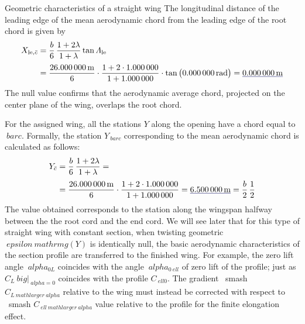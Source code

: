 \documentclass[[12pt,twoside]{book}
\begin{document}
\begin{myExampleX}{Geometric characteristics of a straight wing}{}
The longitudinal distance of the leading edge of the mean aerodynamic chord from the
leading edge of the root chord is given by
\[
\begin{split}
X_{\mathrm{le},\bar{c}} 
  & {}=
    \frac{b}{6} \, \frac{1+2\lambda}{1+\lambda} \tan\Lambda_\mathrm{le} \\[3pt]
  & {}=
    \frac{\SI[round-precision=1]{\mySpanWingMT}{\metre}}{6}
      \cdot 
      \frac{
        1 + 2\cdot\SI[round-precision=2]{\myTaperRatioWing}{}
      }{
        1 + \SI[round-precision=2]{\myTaperRatioWing}{}
      }
      \cdot \tan \big( \SI[round-precision=3]{\myLambdaLERad}{\radian} \big)
    = \mathunderline{mydarkblue}{ \SI[round-precision=2]{\myXLEMACWingMT}{\metre} }%
\end{split}
\]
The null value confirms that the aerodynamic average chord, projected on the center plane
of the wing, overlaps the root chord.

For the assigned wing, all the stations $ Y $ along the opening have a chord equal to $ \ bar {c} $.
Formally, the station $ Y _ {\ bar {c}} $ corresponding to the mean aerodynamic chord
is calculated as follows:
\[
\begin{split}
Y_{\bar{c}} 
  & {}=
    \frac{b}{6} \, \frac{1+2\lambda}{1+\lambda} = \\[3pt]
  & {}=
    \frac{\SI[round-precision=1]{\mySpanWingMT}{\metre}}{6}
      \cdot 
      \frac{
        1 + 2\cdot\SI[round-precision=2]{\myTaperRatioWing}{}
      }{
        1 + \SI[round-precision=2]{\myTaperRatioWing}{}
      }
    = \mathunderline{mydarkblue}{ \SI[round-precision=2]{\myYMACWingMT}{\metre} }
    = \frac{b}{2} \, \frac{1}{2}
\end{split}
\]
The value obtained corresponds to the station along the wingspan halfway between the
the root cord and the end cord.
We will see later that for this type of straight wing with constant section, when twisting
geometric $ \ epsilon_ \ mathrm {g} (Y) $ is identically null,
the basic aerodynamic characteristics of the section profile are transferred to the finished wing.
For example, the zero lift angle $ \ alpha_ {0L} $ coincides with the angle $ \ alpha_ {0 \ ell} $
of zero lift of the profile; just as $ C_L \ big | _ {\ alpha = 0} $ coincides with the profile $ C _ {\ ell 0} $.
The gradient \ smash {$ C_ {L_ \ mathlarger {\ alpha}} $} relative to the wing must instead be corrected with respect to
\ smash {$ C _ {\ ell_ \ mathlarger {\ alpha}} $} value relative to the profile for the finite elongation effect.

\end{myExampleX}
\end{document}
